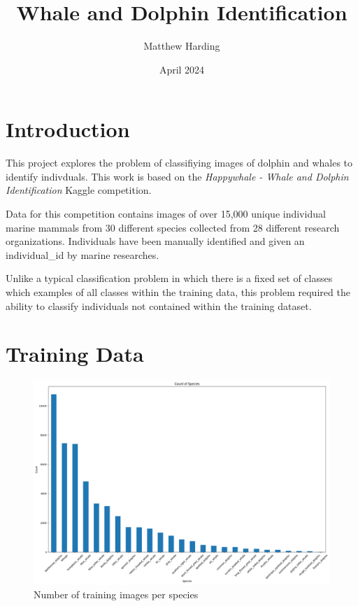 \documentclass{article}
\title{Whale and Dolphin Identification}
\author{Matthew Harding}
\date{April 2024}
\begin{document}
\maketitle

\section{Introduction}
This project explores the problem of classifiying images of dolphin and whales to identify indivduals. This work 
is based on the \emph{Happywhale - Whale and Dolphin Identification} Kaggle competition.\par

Data for this competition contains images of over 15,000 unique individual marine mammals from 30 different species collected from 28 different research organizations. 
Individuals have been manually identified and given an individual\_id by marine researches.\par

Unlike a typical classification problem in which there is a fixed set of classes which examples of all classes within the training data, this problem required the ability to classify individuals not contained within the training dataset.

\section{Training Data}

\begin{figure}[h!]
    \includegraphics[width=\linewidth]{species_histogram.png}
    \caption{Number of training images per species}
    \label{fig:species_count_histogram}
\end{figure}
\end{document}
